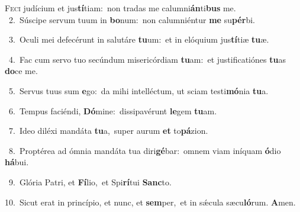 \lettrine{\initial\textcolor{\initialcolor}{F}}{eci} judícium et jus\-\textbf{tí}\-tiam:~\star non tradas me calumni\-\textbf{án}\-ti\textbf{bus} me.\\
{\numbfont\textcolor{\numbcolor}{~2.}}~Súscipe servum tuum in \textbf{bo}\-num:~\star non calumniéntur \textbf{me} su\-\textbf{pér}\-bi.\par
{\numbfont\textcolor{\numbcolor}{~3.}}~Oculi mei defecérunt in salutáre \textbf{tu}\-um:~\star et in elóquium jus\-\textbf{tí}\-tiæ \textbf{tu}\-æ.\par
{\numbfont\textcolor{\numbcolor}{~4.}}~Fac cum servo tuo secúndum misericórdiam \textbf{tu}\-am:~\star et justificatiónes \textbf{tu}\-as \textbf{do}\-ce me.\par
{\numbfont\textcolor{\numbcolor}{~5.}}~Servus tuus sum \textbf{e}\-go:~\star da mihi intelléctum, ut sciam testi\-\textbf{mó}\-nia \textbf{tu}\-a.\par
{\numbfont\textcolor{\numbcolor}{~6.}}~Tempus faciéndi, \textbf{Dó}\-mine:~\star dissipavérunt \textbf{le}\-gem \textbf{tu}\-am.\par
{\numbfont\textcolor{\numbcolor}{~7.}}~Ideo diléxi mandáta \textbf{tu}\-a,~\star super aurum \textbf{et} to\-\textbf{pá}\-zion.\par
{\numbfont\textcolor{\numbcolor}{~8.}}~Proptérea ad ómnia mandáta tua diri\-\textbf{gé}\-bar:~\star omnem viam iníquam \textbf{ó}\-dio \textbf{há}\-bui.\par
{\numbfont\textcolor{\numbcolor}{~9.}}~Glória Patri, et \textbf{Fí}\-lio,~\star et Spi\-\textbf{rí}\-tui \textbf{Sanc}\-to.\par
{\numbfont\textcolor{\numbcolor}{10.}}~Sicut erat in princípio, et nunc, et \textbf{sem}\-per,~\star et in sǽcula sæcu\-\textbf{ló}\-rum. \textbf{A}\-men.\par
